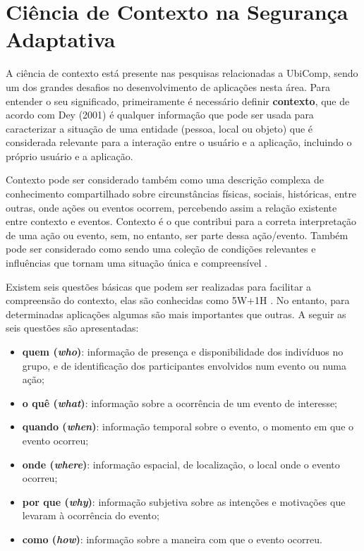 \documentclass[tid,table]{texufpel} %
\begin{document}
\section{Ciência de Contexto na Segurança Adaptativa}

A ciência de contexto está presente nas pesquisas relacionadas a UbiComp, sendo um dos grandes desafios no desenvolvimento de aplicações nesta área.  Para entender o seu significado, primeiramente é necessário definir \textbf{contexto}, que de acordo com Dey (2001)\nocite{dey01} é qualquer informação que pode ser usada para caracterizar a situação de uma entidade (pessoa, local ou objeto) que é considerada relevante para a interação entre o usuário e a aplicação, incluindo o próprio usuário e a aplicação.

Contexto pode ser considerado também como uma descrição complexa de conhecimento compartilhado sobre circunstâncias físicas, sociais, históricas, entre outras, onde ações ou eventos ocorrem, percebendo assim a relação existente entre contexto e eventos. Contexto é o que contribui para a correta interpretação de uma ação ou evento, sem, no entanto, ser parte dessa ação/evento. Também pode ser considerado como sendo uma coleção de condições relevantes e influências que tornam uma situação única e compreensível \cite{brezillon99, li15}.

Existem seis questões básicas que podem ser realizadas para facilitar a compreensão do contexto, elas são conhecidas como 5W+1H \cite{vieira04}. No entanto, para determinadas aplicações algumas são mais importantes que outras. A seguir as seis questões são apresentadas:


\begin{itemize}
\item 
\textbf{quem (\textit{who})}: informação de presença e disponibilidade dos indivíduos no grupo, e de identificação dos participantes envolvidos num evento ou numa ação;

\item
\textbf{o quê (\textit{what})}: informação sobre a ocorrência de um evento de interesse;

\item
\textbf{quando (\textit{when})}: informação temporal sobre o evento, o momento em que o evento ocorreu;

\item
\textbf{onde (\textit{where})}: informação espacial, de localização, o local onde o evento ocorreu;

\item
\textbf{por que (\textit{why})}: informação subjetiva sobre as intenções e motivações que levaram à ocorrência do evento;

\item
\textbf{como (\textit{how})}: informação sobre a maneira com que o evento ocorreu.

\end{itemize}
\end{document}
